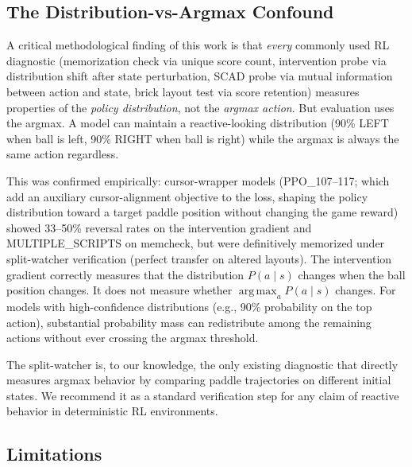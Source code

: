 \documentclass[11pt]{article}
\DeclareMathOperator{\argmax}{arg\,max}
\begin{document}
\subsection{The Distribution-vs-Argmax Confound}
\label{sec:confound}

A critical methodological finding of this work is that \emph{every} commonly
used RL diagnostic (memorization check via unique score count, intervention
probe via distribution shift after state perturbation, SCAD probe via mutual
information between action and state, brick layout test via score
retention) measures properties of the \emph{policy distribution}, not the
\emph{argmax action}. But evaluation uses the argmax. A model can maintain a
reactive-looking distribution (90\% LEFT when ball is left, 90\% RIGHT when
ball is right) while the argmax is always the same action regardless.

This was confirmed empirically: cursor-wrapper models (PPO\_107--117; which
add an auxiliary cursor-alignment objective to the loss, shaping the policy
distribution toward a target paddle position without changing the game reward)
showed 33--50\% reversal rates on the intervention gradient and MULTIPLE\_SCRIPTS on
memcheck, but were definitively memorized under split-watcher verification
(perfect transfer on altered layouts). The intervention gradient correctly
measures that the distribution $P(a \mid s)$ changes when the ball position
changes. It does not measure whether $\argmax_a P(a \mid s)$ changes. For
models with high-confidence distributions (e.g., 90\% probability on the
top action), substantial probability mass can redistribute among the remaining
actions without ever crossing the argmax threshold.

The split-watcher is, to our knowledge, the only existing diagnostic that
directly measures argmax behavior by comparing paddle trajectories on different
initial states. We recommend it as a standard verification step for any claim
of reactive behavior in deterministic RL environments.

\subsection{Limitations}
\label{sec:limitations}
\end{document}

